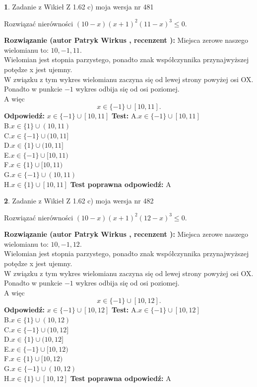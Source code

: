 \documentclass[12pt, a4paper]{article}
\theoremstyle{definition} %
\newtheorem{zad}{}
\newcommand{\zadStart}[1]{\begin{zad}#1\newline}
\newcommand{\zadStop}{\end{zad}}
\newcommand{\rozwStart}[2]{\noindent \textbf{Rozwiązanie (autor #1 , recenzent #2): }\newline}
\newcommand{\rozwStop}{\newline}
\newcommand{\odpStart}{\noindent \textbf{Odpowiedź:}\newline}
\newcommand{\odpStop}{\newline}
\newcommand{\testStart}{\noindent \textbf{Test:}\newline}
\newcommand{\testStop}{\newline}
\newcommand{\kluczStart}{\noindent \textbf{Test poprawna odpowiedź:}\newline}
\newcommand{\kluczStop}{\newline}
\begin{document}
\zadStart{Zadanie z Wikieł Z 1.62 c) moja wersja nr 481}

Rozwiązać nierówności $(10-x)(x+1)^{2}(11-x)^{3}\le0$.
\zadStop
\rozwStart{Patryk Wirkus}{}
Miejsca zerowe naszego wielomianu to: $10, -1, 11$.\\
Wielomian jest stopnia parzystego, ponadto znak współczynnika przy\linebreak najwyższej potędze x jest ujemny.\\ W związku z tym wykres wielomianu zaczyna się od lewej strony powyżej osi OX.\\
Ponadto w punkcie $-1$ wykres odbija się od osi poziomej.\\
A więc $$x \in \{-1\} \cup [10,11].$$
\rozwStop
\odpStart
$x \in \{-1\} \cup [10,11]$
\odpStop
\testStart
A.$x \in \{-1\} \cup [10,11]$\\
B.$x \in \{1\} \cup (10,11)$\\
C.$x \in \{-1\} \cup (10,11]$\\
D.$x \in \{1\} \cup (10,11]$\\
E.$x \in \{-1\} \cup [10,11)$\\
F.$x \in \{1\} \cup [10,11)$\\
G.$x \in \{-1\} \cup (10,11)$\\
H.$x \in \{1\} \cup [10,11]$
\testStop
\kluczStart
A
\kluczStop



\zadStart{Zadanie z Wikieł Z 1.62 c) moja wersja nr 482}

Rozwiązać nierówności $(10-x)(x+1)^{2}(12-x)^{3}\le0$.
\zadStop
\rozwStart{Patryk Wirkus}{}
Miejsca zerowe naszego wielomianu to: $10, -1, 12$.\\
Wielomian jest stopnia parzystego, ponadto znak współczynnika przy\linebreak najwyższej potędze x jest ujemny.\\ W związku z tym wykres wielomianu zaczyna się od lewej strony powyżej osi OX.\\
Ponadto w punkcie $-1$ wykres odbija się od osi poziomej.\\
A więc $$x \in \{-1\} \cup [10,12].$$
\rozwStop
\odpStart
$x \in \{-1\} \cup [10,12]$
\odpStop
\testStart
A.$x \in \{-1\} \cup [10,12]$\\
B.$x \in \{1\} \cup (10,12)$\\
C.$x \in \{-1\} \cup (10,12]$\\
D.$x \in \{1\} \cup (10,12]$\\
E.$x \in \{-1\} \cup [10,12)$\\
F.$x \in \{1\} \cup [10,12)$\\
G.$x \in \{-1\} \cup (10,12)$\\
H.$x \in \{1\} \cup [10,12]$
\testStop
\kluczStart
A
\kluczStop
\end{document}
